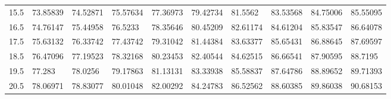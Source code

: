 \documentclass[10pt,twocolumn,letterpaper]{article}
\begin{document}
\begin{table}
{\begin{tabular}{llllllllll}
    15.5            & 73.85839                               & 74.52871                               & 75.57634                                & 77.36973                                & 79.42734                                & 81.5562                                 & 83.53568                                & 84.75006                                & 85.55095                                \\
    16.5            & 74.76147                               & 75.44958                               & 76.5233                                 & 78.35646                                & 80.45209                                & 82.61174                                & 84.61204                                & 85.83547                                & 86.64078                                \\
    17.5            & 75.63132                               & 76.33742                               & 77.43742                                & 79.31042                                & 81.44384                                & 83.63377                                & 85.65431                                & 86.88645                                & 87.69597                                \\
    18.5            & 76.47096                               & 77.19523                               & 78.32168                                & 80.23453                                & 82.40544                                & 84.62515                                & 86.66541                                & 87.90595                                & 88.7195                                 \\
    19.5            & 77.283                                 & 78.0256                                & 79.17863                                & 81.13131                                & 83.33938                                & 85.58837                                & 87.64786                                & 88.89652                                & 89.71393                                \\
    20.5            & 78.06971                               & 78.83077                               & 80.01048                                & 82.00292                                & 84.24783                                & 86.52562                                & 88.60385                                & 89.86038                                & 90.68153                                \\

\end{tabular}}
\end{table}
\end{document}
